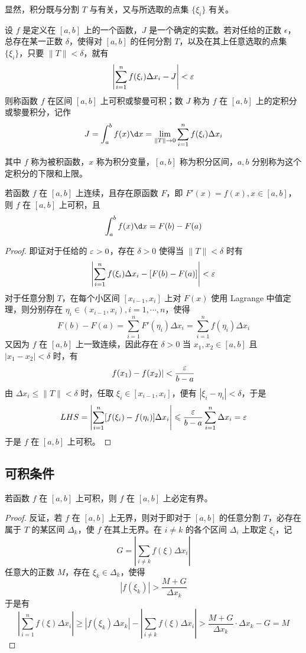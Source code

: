 显然，积分既与分割 $T$ 与有关，又与所选取的点集 $\{\xi_i\}$ 有关。

\begin{definition}
	设 $f$ 是定义在 $[a,b]$ 上的一个函数，$J$ 是一个确定的实数。若对任给的正数 $\epsilon$，总存在某一正数 $\delta$，使得对 $[a,b]$ 的任何分割 $T$，以及在其上任意选取的点集 $\{\xi_i\}$，只要 $\| T \| < \delta$，就有
	\[ \left| \sum_{i=1}^nf(\xi_i)\Delta x_i - J \right| < \varepsilon \]
	则称函数 $f$ 在区间 $[a,b]$ 上可积或黎曼可积；数 $J$ 称为 $f$ 在 $[a,b]$ 上的定积分或黎曼积分，记作
	\[ J = \int_a^b f(x) \d x = \lim_{\| T \| \to 0} \sum_{i=1}^nf(\xi_i)\Delta x_i \]
\end{definition}

其中 $f$ 称为被积函数，$x$ 称为积分变量，$[a,b]$ 称为积分区间，$a,b$ 分别称为这个定积分的下限和上限。

\begin{theorem}
	若函数 $f$ 在 $[a,b]$ 上连续，且存在原函数 $F$，即 $F'(x) = f(x), x\in[a,b]$，则 $f$ 在 $[a,b]$ 上可积，且
	\[ \int_a^bf(x)\d x = F(b) - F(a) \]
\end{theorem}

\begin{proof}
	即证对于任给的 $\varepsilon > 0$，存在 $\delta>0$ 使得当 $\| T \| < \delta$ 时有
	\[ \left| \sum_{i=1}^nf(\xi_i)\Delta x_i - [F(b)-F(a)] \right| < \varepsilon \]
	对于任意分割 $T$，在每个小区间 $[x_{i-1},x_i]$ 上对 $F(x)$ 使用 Lagrange 中值定理，则分别存在 $\eta_i \in (x_{i-1},x_i),i=1,\cdots,n$，使得
	\[ F(b)-F(a) = \sum_{i=1}^n F'(\eta_i)\Delta x_i = \sum_{i=1}^nf(\eta_i)\Delta x_i \]
	又因为 $f$ 在 $[a,b]$ 上一致连续，因此存在 $\delta > 0$ 当 $x_1,x_2\in[a,b]$ 且 $|x_1-x_2| < \delta$ 时，有
	\[ f(x_1) - f(x_2)| < \frac{\varepsilon}{b-a} \]
	由 $\Delta x_i \leqslant \| T \| < \delta$ 时，任取 $\xi_i \in [x_{i-1},x_i]$，便有 $|\xi_i-\eta_i|<\delta$，于是
	\[ LHS = \left| \sum_{i=1}^n [f(\xi_i)-f(\eta_i)]\Delta x_i \right| \leqslant \frac{\varepsilon}{b-a}\sum_{i=1}^n\Delta x_i = \varepsilon \]
	于是 $f$ 在 $[a,b]$ 上可积。
\end{proof}

\subsection{可积条件}

\begin{theorem}
	若函数 $f$ 在 $[a,b]$ 上可积，则 $f$ 在 $[a,b]$ 上必定有界。
\end{theorem}
\begin{proof}
	反证，若 $f$ 在 $[a,b]$ 上无界，则对于即对于 $[a,b]$ 的任意分割 $T$，必存在属于 $T$ 的某区间 $\Delta_k$，使 $f$ 在其上无界。在 $i\ne k$ 的各个区间 $\Delta_i$ 上取定 $\xi_i$，记
	\[ G = \left| \sum_{i\ne k}f(\xi)\Delta x_i \right| \]
	任意大的正数 $M$，存在 $\xi_k\in \Delta_k$，使得
	\[ |f(\xi_k)| > \frac{M+G}{\Delta x_k} \]
	于是有
	\[ \left| \sum_{i=1}^nf(\xi)\Delta x_i \right| \geqslant |f(\xi_k)\Delta x_k| - \left| \sum_{i\ne k}f(\xi)\Delta x_i \right| > \frac{M+G}{\Delta x_k}\cdot \Delta x_k - G = M \]
\end{proof}

